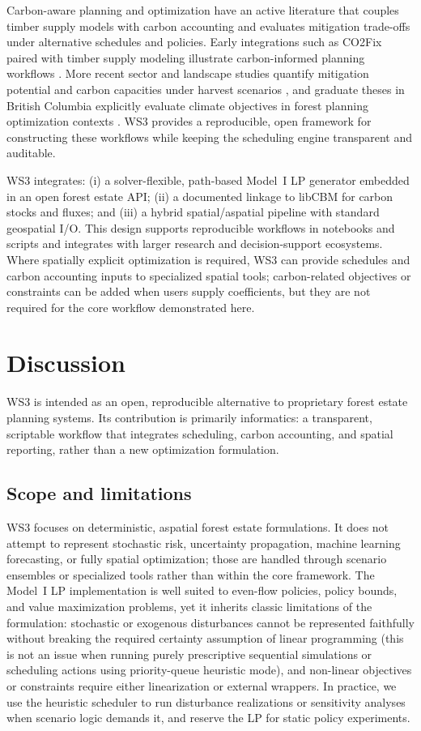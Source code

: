 \documentclass[review]{elsarticle}
\begin{document}
Carbon-aware planning and optimization have an active literature that couples timber supply models with carbon accounting and evaluates mitigation trade-offs under alternative schedules and policies. Early integrations such as CO2Fix paired with timber supply modeling illustrate carbon-informed planning workflows \citep{neilson2006co2fix}. More recent sector and landscape studies quantify mitigation potential and carbon capacities under harvest scenarios \citep{smyth2020climate, boisvenue2022managing}, and graduate theses in British Columbia explicitly evaluate climate objectives in forest planning optimization contexts \citep{ke2024climate, yan2025mathematical}. WS3 provides a reproducible, open framework for constructing these workflows while keeping the scheduling engine transparent and auditable.

WS3 integrates: (i) a solver-flexible, path-based Model~I LP generator embedded in an open forest estate API; (ii) a documented linkage to libCBM for carbon stocks and fluxes; and (iii) a hybrid spatial/aspatial pipeline with standard geospatial I/O. This design supports reproducible workflows in notebooks and scripts and integrates with larger research and decision-support ecosystems. Where spatially explicit optimization is required, WS3 can provide schedules and carbon accounting inputs to specialized spatial tools; carbon-related objectives or constraints can be added when users supply coefficients, but they are not required for the core workflow demonstrated here.

\section{Discussion}
WS3 is intended as an open, reproducible alternative to proprietary forest estate planning systems. Its contribution is primarily informatics: a transparent, scriptable workflow that integrates scheduling, carbon accounting, and spatial reporting, rather than a new optimization formulation.

\subsection{Scope and limitations}
WS3 focuses on deterministic, aspatial forest estate formulations. It does not attempt to represent stochastic risk, uncertainty propagation, machine learning forecasting, or fully spatial optimization; those are handled through scenario ensembles or specialized tools rather than within the core framework. The Model~I LP implementation is well suited to even-flow policies, policy bounds, and value maximization problems, yet it inherits classic limitations of the formulation: stochastic or exogenous disturbances cannot be represented faithfully without breaking the required certainty assumption of linear programming (this is not an issue when running purely prescriptive sequential simulations or scheduling actions using priority-queue heuristic mode), and non-linear objectives or constraints require either linearization or external wrappers. In practice, we use the heuristic scheduler to run disturbance realizations or sensitivity analyses when scenario logic demands it, and reserve the LP for static policy experiments.
\end{document}
